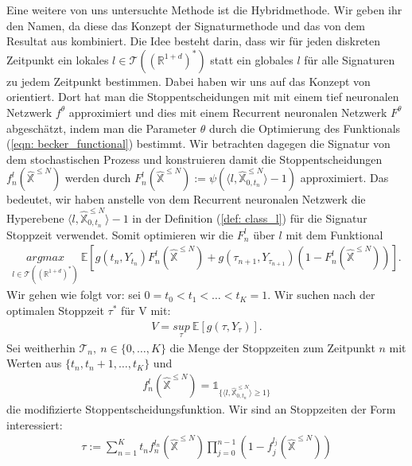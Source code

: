 \documentclass[12pt,titlepage,headsepline]{article}
\begin{document}
      Eine weitere von uns untersuchte Methode ist die Hybridmethode. Wir geben ihr den Namen, da diese das Konzept der Signaturmethode und das von dem Resultat aus \cite{becker_deep_2019} kombiniert. Die Idee besteht darin, dass wir für jeden diskreten Zeitpunkt ein lokales $l \in \mathcal{T}((\mathbb{R}^{1+d})^*)$ statt ein globales $l$ für alle Signaturen zu jedem Zeitpunkt bestimmen. Dabei haben wir uns auf das Konzept von \cite{becker_deep_2019} orientiert. Dort hat man die Stoppentscheidungen mit mit einem tief neuronalen Netzwerk $f^{\theta}$ approximiert und dies mit einem Recurrent neuronalen Netzwerk $F^{\theta}$ abgeschätzt, indem man die Parameter $\theta$ durch die Optimierung des Funktionals (\ref{eqn: becker_functional}) bestimmt.
      \hfill\break
      Wir betrachten dagegen die Signatur von dem stochastischen Prozess und konstruieren damit die Stoppentscheidungen $f_n^l(\hat{\mathbb{X}}^{\leq N})$ werden durch
      $F_n^l(\hat{\mathbb{X}}^{\leq N}) := \psi( \langle l, \hat{\mathbb{X}}^{\leq N}_{0,t_n} \rangle - 1)$ approximiert. Das bedeutet, wir haben anstelle von dem Recurrent neuronalen Netzwerk die Hyperebene $\langle l, \hat{\mathbb{X}}^{\leq N}_{0,t_n} \rangle - 1$ in der Definition (\ref{def: class_l}) für die Signatur Stoppzeit verwendet. Somit optimieren wir die
      $F_n^l$ über $l$ mit dem Funktional
      \begin{align*}
        \underset{l \in \mathcal{T}((\mathbb{R}^{1+d})^*)}{argmax} \ \mathbb{E}[g(t_n, Y_{t_n})F_n^l(\hat{\mathbb{X}}^{\leq N})+g(\tau_{n+1},Y_{\tau_{n+1}})(1-F_n^l(\hat{\mathbb{X}}^{\leq N})) ].
      \end{align*}
      \hfill\break
      Wir gehen wie folgt vor: sei $0=t_0<t_1<\ldots<t_K=1$. Wir suchen nach der optimalen Stoppzeit $\tau^*$ für V mit:
      \begin{align*}
        V = \underset{\tau}{sup} \ \mathbb{E}[g(\tau,Y_{\tau})].
      \end{align*}
      \hfill\break
      Sei weitherhin $\mathcal{T}_n, \ n \in \{0,\ldots,K\}$ die Menge der Stoppzeiten zum Zeitpunkt $n$ mit Werten aus $\{ t_n, t_n+1,\ldots,t_K \}$ und
      \begin{align*}
        f^l_n(\hat{\mathbb{X}}^{\leq N}) = \mathds{1}_{ \{ \langle l, \hat{\mathbb{X}}^{\leq N}_{0,t_n}  \rangle \geq 1 \} }
      \end{align*}
      die modifizierte Stoppentscheidungsfunktion. Wir sind an Stoppzeiten der Form interessiert:
      \begin{align*}
        \tau := \sum_{n=1}^K t_nf_n^{l_n}(\hat{\mathbb{X}}^{\leq N})\prod_{j=0}^{n-1}(1-f_j^{l_j}(\hat{\mathbb{X}}^{\leq N}))
      \end{align*}
\end{document}
